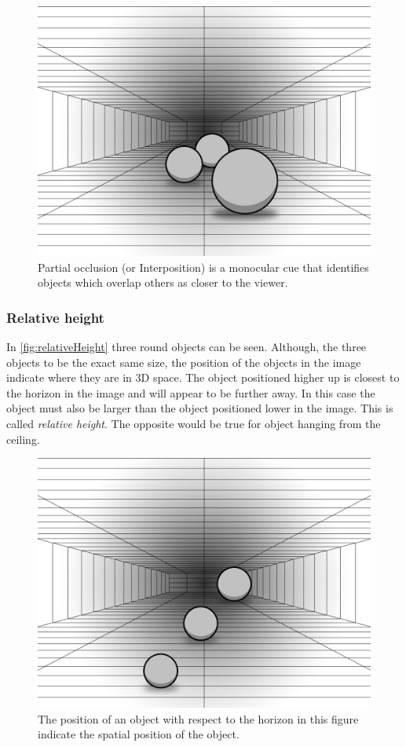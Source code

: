 \begin{figure}[H]
	\centering
	\includegraphics[width=0.8\linewidth]{figure/Analysis/partialOcclusion.png}
	\caption{Partial occlusion (or Interposition) is a monocular cue that identifies objects which overlap others as closer to the viewer.}
	\label{fig:partialOcclusion}
\end{figure}

\subsubsection{Relative height}
In \autoref{fig:relativeHeight} three round objects can be seen. Although, the three objects to be the exact same size, the position of the objects in the image indicate where they are in 3D space. The object positioned higher up is closest to the horizon in the image and will appear to be further away. In this case the object must also be larger than the object positioned lower in the image. This is called \textit{relative height}. The opposite would be true for object hanging from the ceiling\citep[p.~198]{sensationPerception}.

\begin{figure}[H]
	\centering
	\includegraphics[width=0.8\linewidth]{figure/Analysis/relativeHeight.png}
	\caption{The position of an object with respect to the horizon in this figure indicate the spatial position of the object.}
	\label{fig:relativeHeight}
\end{figure}

